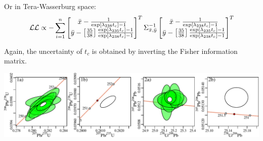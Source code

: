 \begin{refsection}
\begin{enumerate}
    Or in Tera-Wasserburg space:
        \[
    \mathcal{LL} \propto
    - \sum\limits_{i=1}^{n}
    \left[
      \begin{array}{@{}c@{}}
        \bar{x} - \frac{1}{\exp[\lambda_{238}t_c] - 1}\\
        \bar{y} - \left[\frac{35}{38}\right]
        \frac{\exp[\lambda_{235}t_c] - 1}
             {\exp[\lambda_{238}t_c] - 1}
      \end{array}
      \right]^T
    \Sigma_{\bar{x},\bar{y}}^{-1}
    \left[
      \begin{array}{@{}c@{}}
        \bar{x} - \frac{1}{\exp[\lambda_{238}t_c] - 1}\\
        \bar{y} - \left[\frac{35}{38}\right]
        \frac{\exp[\lambda_{235}t_c] - 1}
             {\exp[\lambda_{238}t_c] - 1}
      \end{array}
      \right]^T
    \]

    Again, the uncertainty of $t_c$ is obtained by inverting the
    Fisher information matrix.
    
\end{enumerate}

\noindent\includegraphics[width=\textwidth]{../figures/concordia_age.pdf}
\begingroup {}\endgroup


\printbibliography[heading=subbibliography]

\end{refsection}
